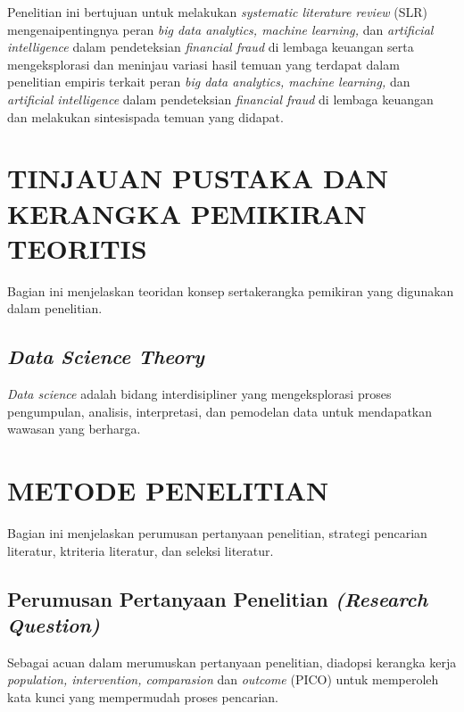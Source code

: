 \documentclass[12pt, a4paper]{article}
\begin{document}
Penelitian ini bertujuan untuk melakukan \textit{systematic literature review} (SLR) mengenaipentingnya peran \textit{big data analytics, machine learning,} dan \textit{artificial intelligence} 
dalam pendeteksian \textit{financial fraud} di lembaga keuangan serta mengeksplorasi dan meninjau variasi hasil temuan yang terdapat dalam   penelitian   empiris   terkait   peran
\textit{big data analytics, machine learning,} dan \textit{artificial intelligence} dalam pendeteksian \textit{financial fraud} di lembaga keuangan dan melakukan
sintesispada temuan yang didapat.

\section*{TINJAUAN PUSTAKA DAN KERANGKA PEMIKIRAN TEORITIS}
\hspace{1cm}Bagian  ini menjelaskan  teoridan  konsep sertakerangka  pemikiran yang  digunakan  dalam penelitian.\\

\subsection*{\textit{Data Science Theory}}
\hspace{1cm}\textit{Data science} adalah bidang interdisipliner yang mengeksplorasi proses pengumpulan, 
analisis, interpretasi, dan pemodelan data untuk mendapatkan wawasan yang berharga.

\section*{METODE PENELITIAN}
\hspace{1cm}Bagian ini menjelaskan perumusan pertanyaan penelitian, strategi pencarian literatur, ktriteria literatur, 
dan seleksi literatur.

\subsection*{Perumusan Pertanyaan Penelitian \textit{(Research Question)}}
\hspace{1cm}Sebagai acuan dalam merumuskan pertanyaan penelitian, diadopsi kerangka kerja 
\textit{population, intervention, comparasion} dan \textit{outcome} (PICO) untuk memperoleh kata kunci yang mempermudah proses pencarian.
\end{document}
